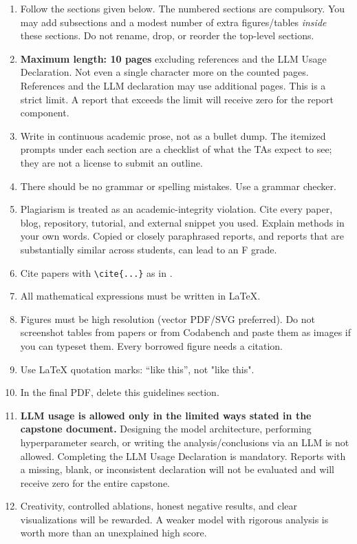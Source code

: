\documentclass[11pt, oneside]{article}
\begin{document}
\begin{enumerate}[leftmargin=*]
    \item Follow the sections given below. The numbered sections are compulsory. You may add subsections and a modest number of extra figures/tables \emph{inside} these sections. Do not rename, drop, or reorder the top-level sections.
    \item \textbf{Maximum length: 10 pages} excluding references and the LLM Usage Declaration. Not even a single character more on the counted pages. References and the LLM declaration may use additional pages. This is a strict limit. A report that exceeds the limit will receive zero for the report component.
    \item Write in continuous academic prose, not as a bullet dump. The itemized prompts under each section are a checklist of what the TAs expect to see; they are not a license to submit an outline.
    \item There should be no grammar or spelling mistakes. Use a grammar checker.
    \item Plagiarism is treated as an academic-integrity violation. Cite every paper, blog, repository, tutorial, and external snippet you used. Explain methods in your own words. Copied or closely paraphrased reports, and reports that are substantially similar across students, can lead to an F grade.
    \item Cite papers with \texttt{\textbackslash cite\{...\}} as in \cite{vaswani2017attention}. 
    \item All mathematical expressions must be written in \LaTeX.
    \item Figures must be high resolution (vector PDF/SVG preferred). Do not screenshot tables from papers or from Codabench and paste them as images if you can typeset them. Every borrowed figure needs a citation. 
    \item Use \LaTeX{} quotation marks: ``like this'', not "like this".
    \item In the final PDF, delete this guidelines section.
    \item \textbf{LLM usage is allowed only in the limited ways stated in the capstone document.} Designing the model architecture, performing hyperparameter search, or writing the analysis/conclusions via an LLM is not allowed. Completing the LLM Usage Declaration is mandatory. Reports with a missing, blank, or inconsistent declaration will not be evaluated and will receive zero for the entire capstone.
    \item Creativity, controlled ablations, honest negative results, and clear visualizations will be rewarded. A weaker model with rigorous analysis is worth more than an unexplained high score.
\end{enumerate}
\end{document}
